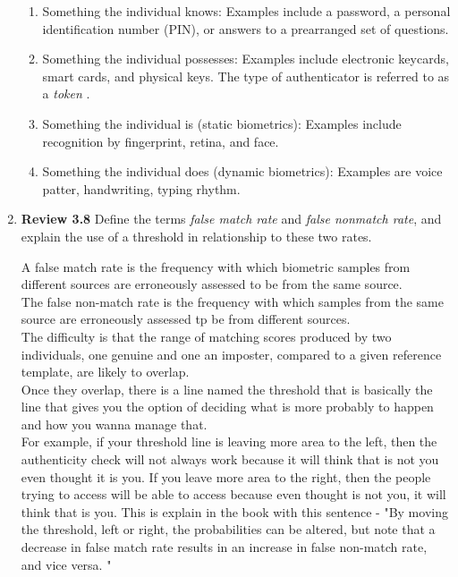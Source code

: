 \documentclass[12pt]{article}
\begin{document}
\begin{enumerate}
	\begin{enumerate}
 	 \item Something the individual knows: Examples include a password, a personal identification number (PIN), or answers to a prearranged set of questions.  
	 \item Something the individual possesses: Examples include electronic keycards, smart cards, and physical keys. The type of authenticator is referred to as a \textit{token} .
 	 \item Something the individual is (static biometrics): Examples include recognition by fingerprint, retina, and face. 
	 \item Something the individual does (dynamic biometrics):  Examples are voice patter, handwriting, typing rhythm. 
	\end{enumerate}
		
	\vspace{10pt}
	
	\item {\textbf{Review 3.8}  Define the terms \textit{false match rate} and \textit{false nonmatch rate}, and explain the use of a threshold in relationship to these two rates.}
	
	A false match rate is the frequency with which biometric samples from different sources are erroneously assessed to be from the same source.\\The false non-match rate is the frequency with which samples from the same source are erroneously assessed tp be from different sources. \\ The difficulty is that the range of matching scores produced by two individuals, one genuine and one an imposter, compared to a given reference template, are likely to overlap. \\Once they overlap, there is a line named the threshold that is basically the line that gives you the option of deciding what is more probably to happen and how you wanna manage that. \\For example, if your threshold line is leaving more area to the left, then the authenticity check will not always work because it will think that is not you even thought it is you. If you leave more area to the right, then the people trying to access will be able to access because even thought is not you, it will think that is you. This is explain in the book with this sentence - "By moving the threshold, left or right, the probabilities can be altered, but note that a decrease in false match rate results in an increase in false non-match rate, and vice versa. " 	
	\vspace{10pt}
	

\end{enumerate}
\end{document}
